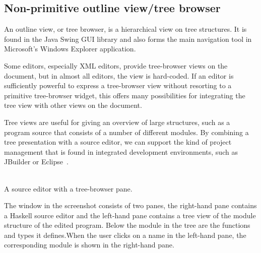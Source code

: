 \documentclass{entcs}
\begin{document}
%																
\subsection{Non-primitive outline view/tree browser}\label{sect:treeBrowser}

An outline view, or tree browser, is a hierarchical view on tree structures. It is found in the Java Swing GUI library and also forms the main navigation tool in Microsoft's Windows Explorer application. 


Some editors, especially XML editors, provide tree-browser views on the document, but in almost all editors, the view is hard-coded. If an editor is sufficiently powerful to express a tree-browser view without resorting to a primitive tree-browser widget, this offers many possibilities for integrating the tree view with other views on the document. 

Tree views are useful for giving an overview of large structures, such as a program source that consists of a number of different modules. By combining a tree presentation with a source editor, we can support the kind of project management that is found in integrated development environments, such as JBuilder or Eclipse~\cite{eclipse2001}. 



\begin{center}
\\ [3mm]
{\normalsize \sf  A source editor with a tree-browser pane.}
\end{center}


The window in the screenshot consists of two panes, the right-hand pane contains a Haskell source editor and the left-hand pane contains a tree view of the module structure of the edited program. \bc Below the module in the tree are the functions and types it defines.\ec When the user clicks on a name in the left-hand pane, the corresponding module is shown in the right-hand pane.
\end{document}
